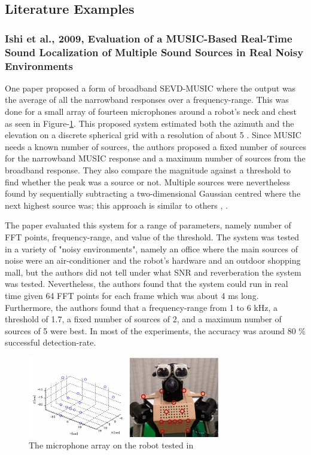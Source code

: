 \documentclass[notitlepage]{report}
\begin{document}
\subsection{Literature Examples}

\subsubsection{Ishi et al., 2009, Evaluation of a MUSIC-Based Real-Time Sound Localization of Multiple Sound Sources in Real Noisy Environments}

One paper \cite{ishi_evaluation_2009} proposed a form of broadband SEVD-MUSIC where the output was the average of all the narrowband responses over a frequency-range. This was done for a small array of fourteen microphones around a robot's neck and chest as seen in Figure-\ref{fig:ishi_2009_array}. This proposed system estimated both the azimuth and the elevation on a discrete spherical grid with a resolution of about 5 \si{\deg}. Since MUSIC needs a known number of sources, the authors proposed a fixed number of sources for the narrowband MUSIC response and a maximum number of sources from the broadband response. They also compare the magnitude against a threshold to find whether the peak was a source or not. Multiple sources were nevertheless found by sequentially subtracting a two-dimensional Gaussian centred where the next highest source was; this approach is similar to others \cite{brutti_multiple_2010}, \cite{basiri_-board_2016}. 

The paper evaluated this system for a range of parameters, namely number of FFT points, frequency-range, and value of the threshold. The system was tested in a variety of "noisy environments", namely an office where the main sources of noise were an air-conditioner and the robot's hardware and an outdoor shopping mall, but the authors did not tell under what SNR and reverberation the system was tested. Nevertheless, the authors found that the system could run in real time given 64 FFT points for each frame which was about 4 \si{ms} long. Furthermore, the authors found that a frequency-range from 1 to 6 \si{kHz}, a threshold of 1.7, a fixed number of sources of 2, and a maximum number of sources of 5 were best. In most of the experiments, the accuracy was around 80 \% successful detection-rate.

\begin{figure}[H]
\includegraphics[width=0.75\textwidth]{./ishi_2009/array.png}
\centering
\caption{The microphone array on the robot tested in \cite{ishi_evaluation_2009}}
\label{fig:ishi_2009_array}
\centering
\end{figure}
\end{document}

